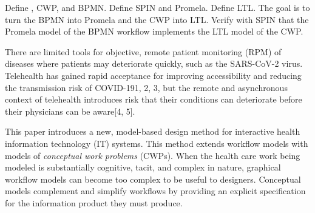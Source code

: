 Define \phware, CWP, and BPMN. Define SPIN and Promela. Define LTL. The goal is to turn the BPMN into Promela and the CWP into LTL. Verify with SPIN that the Promela model of the BPMN workflow implements the LTL model of the CWP.


There are limited tools for objective, remote patient monitoring (RPM) of diseases where patients may deteriorate quickly, such as the SARS-CoV-2 virus. Telehealth has gained rapid acceptance for improving accessibility and reducing the transmission risk of COVID-191, 2, 3, but the remote and asynchronous context of telehealth introduces risk that their conditions can deteriorate before their physicians can be aware[4, 5]. 

This paper introduces a new, model-based design method for interactive health information technology (IT) systems. This method extends workflow models with models of \emph{conceptual work problems} (CWPs). When the health care work being modeled is substantially cognitive, tacit, and complex in nature, graphical workflow models can become too complex to be useful to designers. Conceptual models complement and simplify workflows by providing an explicit specification for the information product they must produce.

